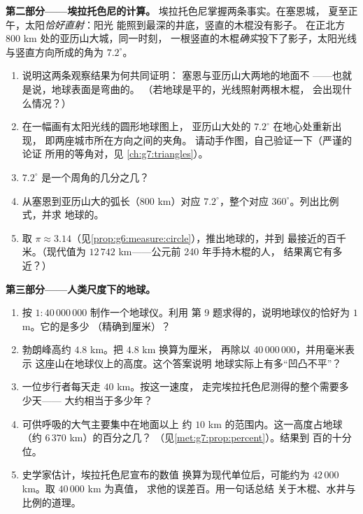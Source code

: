 \begin{problem}
\medskip
\noindent\textbf{第二部分——埃拉托色尼的计算。}
埃拉托色尼掌握两条事实。在塞恩城，
夏至正午，太阳\emph{恰好直射}：阳光
能照到最深的井底，竖直的木棍没有影子。
在正北方 $800$ km 处的亚历山大城，同一时刻，
一根竖直的木棍\emph{确实}投下了影子，太阳光线
与竖直方向所成的角为 $7.2^\circ$。
\begin{enumerate}[resume]
  \item 说明这两条观察结果为何共同证明：
        塞恩与亚历山大两地的地面不
——也就是说，地球表面是弯曲的。
        （若地球是平的，光线照射两根木棍，
        会出现什么情况？）
  \item 在一幅画有太阳光线的圆形地球图上，
        亚历山大处的 $7.2^\circ$ 在地心处重新出现，
        即两座城市所在方向之间的夹角。
        请动手作图，自己验证一下（严谨的论证
        所用的等角对，见
        \cref{ch:g7:triangles}）。
  \item $7.2^\circ$ 是一个周角的几分之几？
  \item 从塞恩到亚历山大的弧长（$800$ km）对应
        $7.2^\circ$，整个对应
        $360^\circ$。列出比例式，并求
        地球的。
  \item 取 $\pi \approx
        3.14$（见\cref{prop:g6:measure:circle}），推出地球的，并到
        最接近的百千米。（现代值为
        $12\,742$ km——公元前 240 年手持木棍的人，
        结果离它有多近？）
\end{enumerate}

\medskip
\noindent\textbf{第三部分——人类尺度下的地球。}
\begin{enumerate}[resume]
  \item 按 $1 : 40\,000\,000$ 制作一个地球仪。利用
        第 9 题求得的，说明地球仪的恰好为
        $1$ m。它的是多少
        （精确到厘米）？
  \item 勃朗峰高约 $4.8$ km。把 $4.8$ km 换算为厘米，
        再除以 $40\,000\,000$，并用毫米表示
        这座山在地球仪上的高度。这个答案说明
        地球实际上有多“凹凸不平”？
  \item 一位步行者每天走 $40$ km。按这一速度，
        走完埃拉托色尼测得的整个需要多少天——
        大约相当于多少年？
  \item 可供呼吸的大气主要集中在地面以上
        约 $10$ km 的范围内。这一高度占地球
        （约 $6\,370$ km）的百分之几？
        （见\cref{met:g7:prop:percent}）。结果到
        百的十分位。
  \item 史学家估计，埃拉托色尼宣布的数值
        换算为现代单位后，可能约为
        $42\,000$ km。取 $40\,000$ km 为真值，
        求他的误差百。用一句话总结
        关于木棍、水井与比例的道理。
\end{enumerate}
\end{problem}
